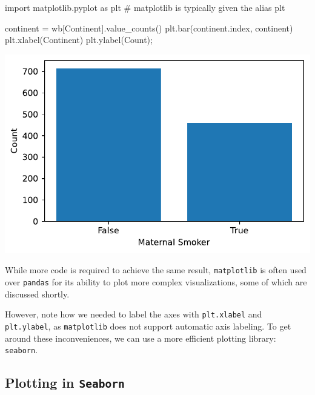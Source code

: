 \documentclass[
  letterpaper,
  DIV=11,
  numbers=noendperiod]{scrreprt}
\newenvironment{Shaded}{\begin{snugshade}}{\end{snugshade}}
\newcommand{\CommentTok}[1]{\textcolor[rgb]{0.37,0.37,0.37}{#1}}
\newcommand{\ImportTok}[1]{\textcolor[rgb]{0.00,0.46,0.62}{#1}}
\newcommand{\NormalTok}[1]{\textcolor[rgb]{0.00,0.23,0.31}{#1}}
\newcommand{\OperatorTok}[1]{\textcolor[rgb]{0.37,0.37,0.37}{#1}}
\newcommand{\StringTok}[1]{\textcolor[rgb]{0.13,0.47,0.30}{#1}}
\begin{document}
\begin{Shaded}
\begin{Highlighting}[]
\ImportTok{import}\NormalTok{ matplotlib.pyplot }\ImportTok{as}\NormalTok{ plt }\CommentTok{\# matplotlib is typically given the alias plt}

\NormalTok{continent }\OperatorTok{=}\NormalTok{ wb[}\StringTok{\textquotesingle{}Continent\textquotesingle{}}\NormalTok{].value\_counts()}
\NormalTok{plt.bar(continent.index, continent)}
\NormalTok{plt.xlabel(}\StringTok{\textquotesingle{}Continent\textquotesingle{}}\NormalTok{)}
\NormalTok{plt.ylabel(}\StringTok{\textquotesingle{}Count\textquotesingle{}}\NormalTok{)}\OperatorTok{;}
\end{Highlighting}
\end{Shaded}

\includegraphics{visualization_1/visualization_1_files/figure-pdf/cell-4-output-1.pdf}

While more code is required to achieve the same result,
\texttt{matplotlib} is often used over \texttt{pandas} for its ability
to plot more complex visualizations, some of which are discussed
shortly.

However, note how we needed to label the axes with \texttt{plt.xlabel}
and \texttt{plt.ylabel}, as \texttt{matplotlib} does not support
automatic axis labeling. To get around these inconveniences, we can use
a more efficient plotting library: \texttt{seaborn}.

\subsection{\texorpdfstring{Plotting in
\texttt{Seaborn}}{Plotting in Seaborn}}\label{plotting-in-seaborn}
\end{document}
